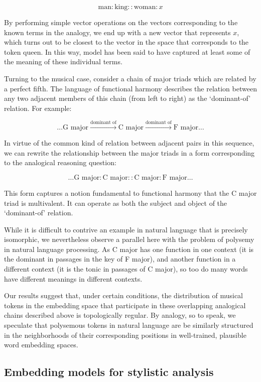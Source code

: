 $$\textrm{man}:\textrm{king}::\textrm{woman}:x$$

By performing simple vector operations on the vectors corresponding to the known terms in the analogy, we end up with a new vector that represents $x$, which turns out to be closest to the vector in the space that corresponds to the token $\textrm{queen}$. In this way, model has been said to have captured at least some of the meaning of these individual terms.

Turning to the musical case, consider a chain of major triads which are related by a perfect fifth. The language of functional harmony describes the relation between any two adjacent members of this chain (from left to right) as the `dominant-of' relation. For example:

$$\hdots \textrm{G major} \xrightarrow{\textrm{dominant of}} \textrm{C major} \xrightarrow{\textrm{dominant of}} \textrm{F major} \hdots$$

In virtue of the common kind of relation between adjacent pairs in this sequence, we can rewrite the relationship between the major triads in a form corresponding to the analogical reasoning question:

$$\hdots \textrm{G major} : \textrm{C major}  :: \textrm{C major} : \textrm{F major} \hdots$$

This form captures a notion fundamental to functional harmony that the C major triad is multivalent. It can operate as both the subject and object of the `dominant-of' relation. 

While it is difficult to contrive an example in natural language that is precisely isomorphic, we nevertheless observe a parallel here with the problem of polysemy in natural language processing. As C major has one function in one context (it is the dominant in passages in the key of F major), and another function in a different context (it is the tonic in passages of C major), so too do many words have different meanings in different contexts.

Our results suggest that, under certain conditions, the distribution of musical tokens in the embedding space that participate in these overlapping analogical chains described above is topologically regular. By analogy, so to speak, we speculate that polysemous tokens in natural language are be similarly structured in the neighborhoods of their corresponding positions in well-trained, plausible word embedding spaces.

\subsection{Embedding models for stylistic analysis}

